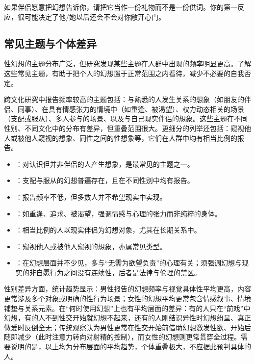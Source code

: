 \begin{tcolorbox}[colback=pink!5!white,colframe=red!50!black,title=贴心小叮咛]
如果伴侣愿意把幻想告诉你，请把它当作一份礼物而不是一份供词。你的第一反应，很可能决定了他/她以后还会不会对你敞开心门。
\end{tcolorbox}

\subsection{常见主题与个体差异}

性幻想的主题分布广泛，但研究发现某些主题在人群中出现的频率明显更高。了解这些常见主题，有助于把个人的幻想置于正常范围之内看待，减少不必要的自我否定。

跨文化研究中报告频率较高的主题包括：与熟悉的人发生关系的想象（如朋友的伴侣、同事）、在具有情感张力的情境中（如重逢、被渴望）、权力动态相关的场景（支配或服从）、多人参与的场景、以及与自己现实伴侣的想象。这些主题在不同性别、不同文化中的分布有差异，但重叠范围很大。更细分的列举还包括：窥视他人或被他人窥视的想象、同性之间的性想象等，它们在人群中均有相当比例的报告。

\begin{itemize}
  \item {}：对认识但并非伴侣的人产生想象，是最常见的主题之一。
  \item {}：支配与服从的幻想普遍存在，且在不同性别中均有报告。
  \item {}：报告频率不低，但多数人并不希望现实中实现。
  \item {}：如重逢、追求、被渴望，强调情感与心理的张力而非纯粹的身体。
  \item {}：相当比例的人以现实伴侣为幻想对象，尤其在长期关系中。
  \item {}：窥视他人或被他人窥视的想象，亦属常见类型。
  \item {}：在幻想层面并不少见，多与“无需为欲望负责”的心理有关；须强调幻想与现实的非自愿行为之间没有连续性，后者是法律与伦理的禁区。
\end{itemize}

性别差异方面，统计趋势显示：男性报告的幻想频率与视觉具体性平均更高，内容更常涉及多个对象或明确的性行为场景；女性的幻想平均更常包含情感叙事、情境铺垫与关系元素。在“何时使用幻想”上也有平均层面的差异：有的人只在“前戏”中幻想，有的人不到性交开始就幻想不起来，还有的人刚结识异性时幻想纷呈、真正做爱时反倒全无；传统观察认为男性更常在性交开始前借助幻想激发性欲、开始后随即减少（此时注意力转向对射精的控制），而女性的幻想则更常贯穿全过程。需要说明的是，以上均为分布层面的平均趋势，个体重叠极大，不应据此预判具体的人。

